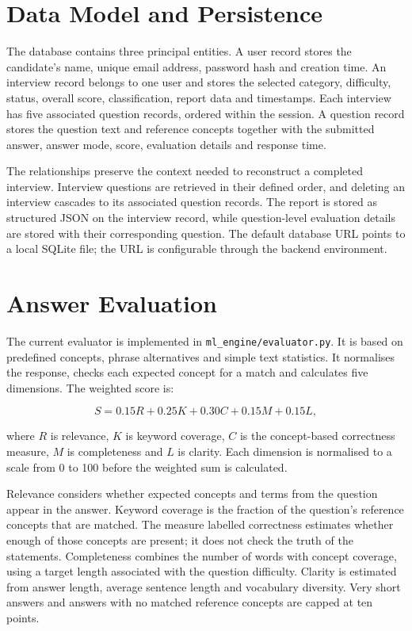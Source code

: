 \documentclass[12pt,a4paper,oneside]{report}
\begin{document}
\section{Data Model and Persistence}
The database contains three principal entities. A user record stores the candidate's name, unique email address, password hash and creation time. An interview record belongs to one user and stores the selected category, difficulty, status, overall score, classification, report data and timestamps. Each interview has five associated question records, ordered within the session. A question record stores the question text and reference concepts together with the submitted answer, answer mode, score, evaluation details and response time.

The relationships preserve the context needed to reconstruct a completed interview. Interview questions are retrieved in their defined order, and deleting an interview cascades to its associated question records. The report is stored as structured JSON on the interview record, while question-level evaluation details are stored with their corresponding question. The default database URL points to a local SQLite file; the URL is configurable through the backend environment.

\section{Answer Evaluation}
The current evaluator is implemented in \texttt{ml\_engine/evaluator.py}. It is based on predefined concepts, phrase alternatives and simple text statistics. It normalises the response, checks each expected concept for a match and calculates five dimensions. The weighted score is:

\[
S = 0.15R + 0.25K + 0.30C + 0.15M + 0.15L,
\]

where \(R\) is relevance, \(K\) is keyword coverage, \(C\) is the concept-based correctness measure, \(M\) is completeness and \(L\) is clarity. Each dimension is normalised to a scale from 0 to 100 before the weighted sum is calculated.

Relevance considers whether expected concepts and terms from the question appear in the answer. Keyword coverage is the fraction of the question's reference concepts that are matched. The measure labelled correctness estimates whether enough of those concepts are present; it does not check the truth of the statements. Completeness combines the number of words with concept coverage, using a target length associated with the question difficulty. Clarity is estimated from answer length, average sentence length and vocabulary diversity. Very short answers and answers with no matched reference concepts are capped at ten points.
\end{document}
